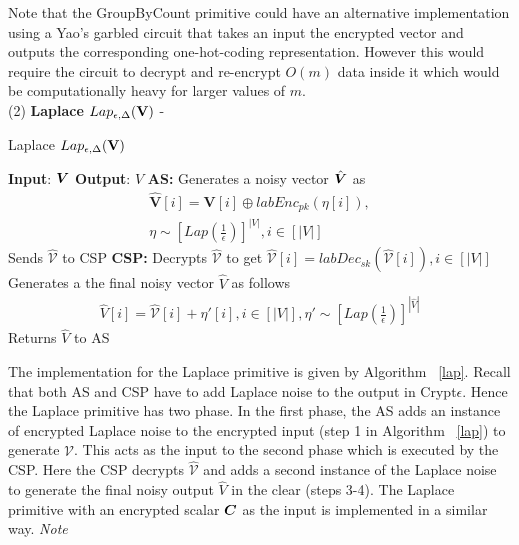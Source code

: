 Note that the \textsf{GroupByCount} primitive could have an alternative implementation using a Yao's garbled circuit that takes an input the encrypted vector and outputs the corresponding one-hot-coding representation. However this would require the circuit to decrypt and re-encrypt $O(m)$ data inside it which would be computationally heavy for larger values of $m$. 
 \\ (2)\textbf{ \textsf{Laplace }}$Lap_{\epsilon,\Delta}(\mathbf{V})$ -  
\begin{algorithm}
\small
\caption{\textsf{Laplace }$Lap_{\epsilon,\Delta}(\mathbf{V})$}
\begin{algorithmic}[1]
\STATEx
\textbf{Input}: $\boldsymbol{V}$
\STATEx \textbf{Output}: $\hat{V}$
\STATEx \textbf{\textsf{AS}:} \STATE Generates a noisy vector $\hat{\boldsymbol{V}}$  as \begin{gather*}\hat{\mathbf{V}}[i] = \mathbf{V}[i]\oplus labEnc_{pk}(\eta[i]),\\ \eta \sim [Lap(\frac{1}{\epsilon})]^{|V|}, i \in [|V|] \end{gather*}
\STATE Sends $\hat{\mathbb{\mathcal{V}}}$  to \textsf{CSP}
\STATEx \textbf{\textsf{CSP}:}
\STATE Decrypts $\mathbf{\hat{\mathcal{V}}}$ to get $\hat{\mathcal{V}}[i]=labDec_{sk}(\mathbf{\hat{\mathcal{V}}}[i]), i \in [|V|]$
\STATE Generates a the final noisy vector $\hat{V}$ as follows 
\begin{gather*} \hat{V}[i]=\hat{\mathcal{V}}[i]+\eta'[i], i \in [|V|], \eta' \sim [Lap(\frac{1}{\epsilon})]^{|\hat{V}|} \end{gather*}
\STATE Returns $\hat{V}$ to \textsf{AS}
 \end{algorithmic} \label{lap}
\end{algorithm} The implementation for the \textsf{Laplace} primitive is given by Algorithm ~\ref{lap}. Recall that both \textsf{AS} and \textsf{CSP} have to add Laplace noise to the output in Crypt$\epsilon$. Hence the \textsf{Laplace} primitive has two phase. In the first phase,  the \textsf{AS} adds an instance of encrypted Laplace noise to the encrypted input (step 1 in Algorithm ~\ref{lap}) to generate $\mathbf{\hat{\mathcal{V}}}$. This acts as the input to the second phase which is executed by the \textsf{CSP}. Here the \textsf{CSP} decrypts $\mathbf{\hat{\mathcal{V}}}$ and adds a second instance of the Laplace noise to generate the final noisy output $\hat{V}$ in the clear (steps 3-4). The \textsf{Laplace} primitive with an encrypted scalar $\boldsymbol{C}$ as the input is implemented in a similar way. 
\textit{Note}
